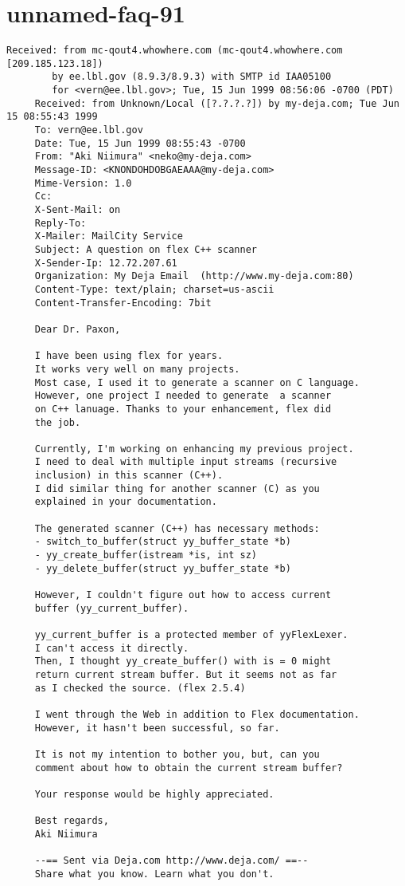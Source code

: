 \documentclass[openany,oneside]{book}
\begin{document}
\section{unnamed-faq-91}

\begin{verbatim}
Received: from mc-qout4.whowhere.com (mc-qout4.whowhere.com [209.185.123.18])
     	by ee.lbl.gov (8.9.3/8.9.3) with SMTP id IAA05100
     	for <vern@ee.lbl.gov>; Tue, 15 Jun 1999 08:56:06 -0700 (PDT)
     Received: from Unknown/Local ([?.?.?.?]) by my-deja.com; Tue Jun 15 08:55:43 1999
     To: vern@ee.lbl.gov
     Date: Tue, 15 Jun 1999 08:55:43 -0700
     From: "Aki Niimura" <neko@my-deja.com>
     Message-ID: <KNONDOHDOBGAEAAA@my-deja.com>
     Mime-Version: 1.0
     Cc:
     X-Sent-Mail: on
     Reply-To:
     X-Mailer: MailCity Service
     Subject: A question on flex C++ scanner
     X-Sender-Ip: 12.72.207.61
     Organization: My Deja Email  (http://www.my-deja.com:80)
     Content-Type: text/plain; charset=us-ascii
     Content-Transfer-Encoding: 7bit
     
     Dear Dr. Paxon,
     
     I have been using flex for years.
     It works very well on many projects.
     Most case, I used it to generate a scanner on C language.
     However, one project I needed to generate  a scanner
     on C++ lanuage. Thanks to your enhancement, flex did
     the job.
     
     Currently, I'm working on enhancing my previous project.
     I need to deal with multiple input streams (recursive
     inclusion) in this scanner (C++).
     I did similar thing for another scanner (C) as you
     explained in your documentation.
     
     The generated scanner (C++) has necessary methods:
     - switch_to_buffer(struct yy_buffer_state *b)
     - yy_create_buffer(istream *is, int sz)
     - yy_delete_buffer(struct yy_buffer_state *b)
     
     However, I couldn't figure out how to access current
     buffer (yy_current_buffer).
     
     yy_current_buffer is a protected member of yyFlexLexer.
     I can't access it directly.
     Then, I thought yy_create_buffer() with is = 0 might
     return current stream buffer. But it seems not as far
     as I checked the source. (flex 2.5.4)
     
     I went through the Web in addition to Flex documentation.
     However, it hasn't been successful, so far.
     
     It is not my intention to bother you, but, can you
     comment about how to obtain the current stream buffer?
     
     Your response would be highly appreciated.
     
     Best regards,
     Aki Niimura
     
     --== Sent via Deja.com http://www.deja.com/ ==--
     Share what you know. Learn what you don't.
\end{verbatim}
\end{document}
